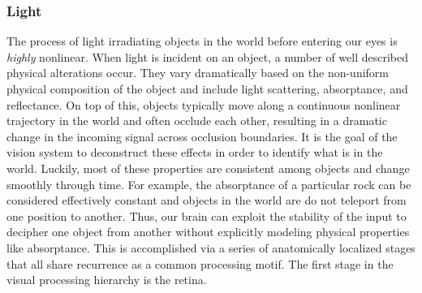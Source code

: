 \subsubsection{Light}
The process of light irradiating objects in the world before entering our eyes is \textit{highly} nonlinear. When light is incident on an object, a number of well described physical alterations occur. They vary dramatically based on the non-uniform physical composition of the object and include light scattering, absorptance, and reflectance. On top of this, objects typically move along a continuous nonlinear trajectory in the world and often occlude each other, resulting in a dramatic change in the incoming signal across occlusion boundaries. It is the goal of the vision system to deconstruct these effects in order to identify what is in the world. Luckily, most of these properties are consistent among objects and change smoothly through time. For example, the absorptance of a particular rock can be considered effectively constant and objects in the world are do not teleport from one position to another. Thus, our brain can exploit the stability of the input to decipher one object from another without explicitly modeling physical properties like absorptance. This is accomplished via a series of anatomically localized stages that all share recurrence as a common processing motif. The first stage in the visual processing hierarchy is the retina.


